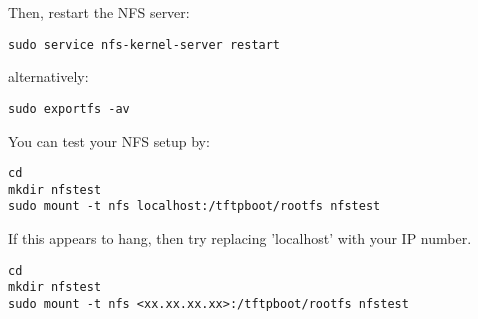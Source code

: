 Then, restart the NFS server:

\begin{verbatim}
sudo service nfs-kernel-server restart
\end{verbatim}

alternatively:

\begin{verbatim}
sudo exportfs -av
\end{verbatim}

You can test your NFS setup by:

\begin{verbatim}
cd
mkdir nfstest
sudo mount -t nfs localhost:/tftpboot/rootfs nfstest
\end{verbatim}

\clearpage
If this appears to hang, then try replacing 'localhost' with your IP number.

\begin{verbatim}
cd
mkdir nfstest
sudo mount -t nfs <xx.xx.xx.xx>:/tftpboot/rootfs nfstest
\end{verbatim}

